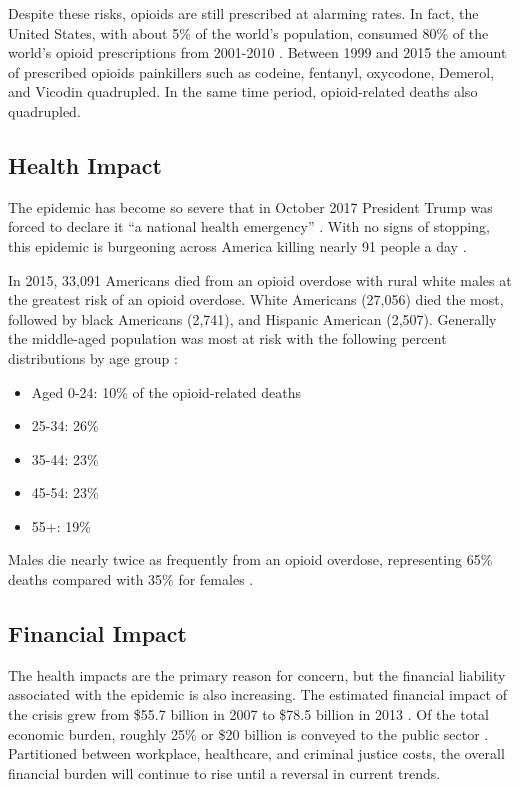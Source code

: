 \documentclass[sigconf]{acmart}
\begin{document}
Despite these risks, opioids are still prescribed at alarming rates. In fact, the United States, with about 5\% of the world's population, consumed 80\% of the world's opioid prescriptions from 2001-2010 \cite{Vowles01}. Between 1999 and 2015 the amount of prescribed opioids painkillers such as codeine, fentanyl, oxycodone, Demerol, and Vicodin quadrupled. In the same time period, opioid-related deaths also quadrupled.
 
\subsection{Health Impact}
The epidemic has become so severe that in October 2017 President Trump was forced to declare it ``a national health emergency'' \cite{opsis3}.    With no signs of stopping, this epidemic is burgeoning across America killing nearly 91 people a day \cite{opsis10}.
 
In 2015, 33,091 Americans died from an opioid overdose with rural white males at the greatest risk of an opioid overdose.  White Americans (27,056) died the most, followed by black Americans (2,741), and Hispanic American (2,507). Generally the middle-aged population was most at risk with the following percent distributions by age group \cite{opsis4}:
\begin{itemize}
\item Aged 0-24: 10\% of the opioid-related deaths
\item 25-34: 26\% 
\item 35-44: 23\% 
\item 45-54: 23\% 
\item 55+: 19\% 
\end{itemize}
Males die nearly twice as frequently from an opioid overdose, representing 65\% deaths compared with 35\% for females \cite{opsis4}.

\subsection{Financial Impact} 
The health impacts are the primary reason for concern, but the financial liability associated with the epidemic is also increasing. The estimated financial impact of the crisis grew from \$55.7 billion in 2007 \cite{Birnbaum01} to \$78.5 billion in 2013 \cite{Florence01}. Of the total economic burden, roughly 25\% or \$20 billion is conveyed to the public sector \cite{Florence01}. Partitioned between workplace, healthcare, and criminal justice costs, the overall financial burden will continue to rise until a reversal in current trends. 
\end{document}
